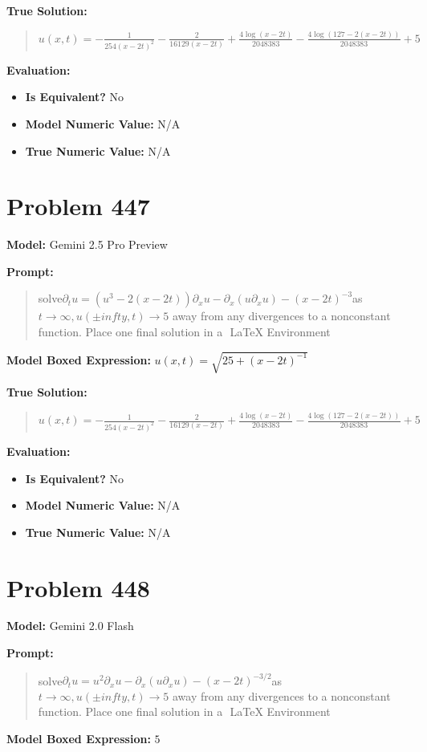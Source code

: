 \documentclass{article}
\begin{document}
\textbf{True Solution:}
\begin{quote}
$u(x,t)=-\frac{1}{254 (x-2t)^2}-\frac{2}{16129 (x-2t)}+\frac{4 \log (x-2t)}{2048383}-\frac{4 \log (127-2 (x-2t))}{2048383}+5$
\end{quote}

\textbf{Evaluation:}
\begin{itemize}
\item \textbf{Is Equivalent?} No
\item \textbf{Model Numeric Value:} N/A
\item \textbf{True Numeric Value:} N/A
\end{itemize}
\vspace{1cm}
\section*{Problem 447}
\textbf{Model:} Gemini 2.5 Pro Preview

\textbf{Prompt:}
\begin{quote}
solve$ \partial_t u = (u^3-2(x-2t)) \partial_x u - \partial_x \left( u \partial_x u \right) - (x-2t)^{-3} $as $t\to\infty, u(\pm infty,t)\to 5$ away from any divergences to a nonconstant function. Place one final solution in a $\boxed{}$ LaTeX Environment
\end{quote}
\textbf{Model Boxed Expression:} $u(x,t) = \sqrt{25+(x-2t)^{-1}}$

\textbf{True Solution:}
\begin{quote}
$u(x,t)=-\frac{1}{254 (x-2t)^2}-\frac{2}{16129 (x-2t)}+\frac{4 \log (x-2t)}{2048383}-\frac{4 \log (127-2 (x-2t))}{2048383}+5$
\end{quote}

\textbf{Evaluation:}
\begin{itemize}
\item \textbf{Is Equivalent?} No
\item \textbf{Model Numeric Value:} N/A
\item \textbf{True Numeric Value:} N/A
\end{itemize}
\vspace{1cm}
\section*{Problem 448}
\textbf{Model:} Gemini 2.0 Flash

\textbf{Prompt:}
\begin{quote}
solve$ \partial_t u = u^2 \partial_x u - \partial_x \left( u \partial_x u \right) - (x-2t)^{-3/2} $as $t\to\infty, u(\pm infty,t)\to 5$ away from any divergences to a nonconstant function. Place one final solution in a $\boxed{}$ LaTeX Environment
\end{quote}
\textbf{Model Boxed Expression:} $5$
\end{document}
